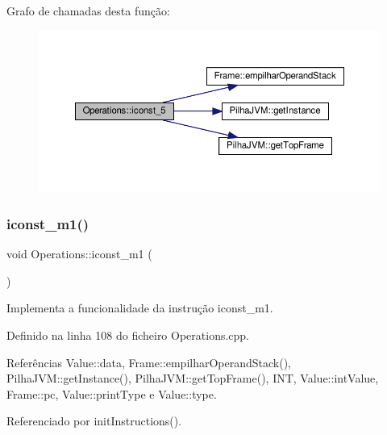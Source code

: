 Grafo de chamadas desta função\+:\nopagebreak
\begin{figure}[H]
\begin{center}
\leavevmode
\includegraphics[width=350pt]{classOperations_a87a4c7214825d084ded4a8ea50e4af7c_cgraph}
\end{center}
\end{figure}
\mbox{\label{classOperations_abb57552d42047d4b685b2d68db6b1fd7}} 
\subsubsection{\texorpdfstring{iconst\+\_\+m1()}{iconst\_m1()}}
{\footnotesize\ttfamily void Operations\+::iconst\+\_\+m1 (\begin{DoxyParamCaption}{ }\end{DoxyParamCaption})\hspace{0.3cm}{\ttfamily [private]}}



Implementa a funcionalidade da instrução iconst\+\_\+m1. 



Definido na linha 108 do ficheiro Operations.\+cpp.



Referências Value\+::data, Frame\+::empilhar\+Operand\+Stack(), Pilha\+J\+V\+M\+::get\+Instance(), Pilha\+J\+V\+M\+::get\+Top\+Frame(), I\+NT, Value\+::int\+Value, Frame\+::pc, Value\+::print\+Type e Value\+::type.



Referenciado por init\+Instructions().

